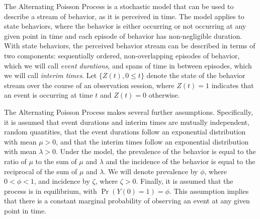 \documentclass[man, noextraspace, floatsintext]{apa6}\usepackage[]{graphicx}\usepackage[]{color}
\begin{document}
The Alternating Poisson Process is a stochastic model that can be used to describe a stream of behavior, as it is perceived in time. 
The model applies to state behaviors, where the behavior is either occurring or not occurring at any given point in time and each episode of behavior has non-negligible duration. 
With state behaviors, the perceived behavior stream can be described in terms of two components: sequentially ordered, non-overlapping episodes of behavior, which we will call \textit{event durations}, and spans of time in between episodes, which we will call \textit{interim times}. 
Let $\{Z(t), 0 \leq t\}$ denote the state of the behavior stream over the course of an observation session, where $Z(t) = 1$ indicates that an event is occurring at time $t$ and $Z(t) = 0$ otherwise.

The Alternating Poisson Process makes several further assumptions. 
Specifically, it is assumed that event durations and interim times are mutually independent, random quantities, that the event durations follow an exponential distribution with mean $\mu > 0$, and that the interim times follow an exponential distribution with mean $\lambda > 0$. 
Under the model, the prevalence of the behavior is equal to the ratio of $\mu$ to the sum of $\mu$ and $\lambda$ and the incidence of the behavior is equal to the reciprocal of the sum of $\mu$ and $\lambda$. 
We will denote prevalence by $\phi$, where $0 < \phi < 1$, and incidence by $\zeta$, where $\zeta > 0$. Finally, it is assumed that the process is in equilibrium, with $\Pr\left(Y(0) = 1\right) = \phi$. 
This assumption implies that there is a constant marginal probability of observing an event at any given point in time.
\end{document}
